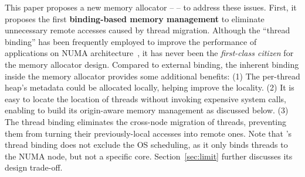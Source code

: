 This paper proposes a new memory allocator -- \NM{} -- to address these issues. 
First, it proposes the first \textbf{binding-based memory management} to eliminate unnecessary remote accesses caused by thread migration. Although the ``thread binding'' has been frequently employed to improve the performance of applications on NUMA architecture~\cite{li2013numa, XuNuma, Lepers:2015:TMP:2813767.2813788}, it has never been the \textit{first-class citizen} for the memory allocator design. Compared to external binding, the inherent binding inside the memory allocator provides some additional benefits: (1) The per-thread heap's metadata could be allocated locally, helping improve the locality. (2) It is easy to locate the location of threads without invoking expensive system calls, enabling \NM{} to build its origin-aware memory management as discussed below. (3) The thread binding eliminates the cross-node migration of threads, preventing them from turning their previously-local accesses into remote ones. 
Note that \NM{}'s thread binding does not exclude the OS scheduling, as it only binds threads to the NUMA node, but not a specific core. Section~\ref{sec:limit} further discusses its design trade-off.  

